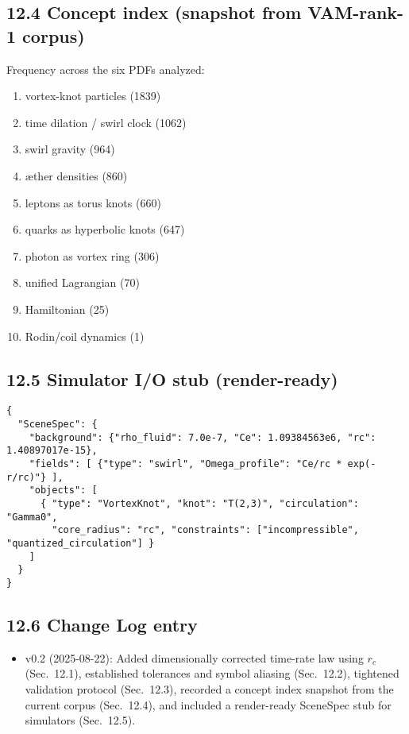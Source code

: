 \documentclass[11pt, a4paper]{article}
\begin{document}
\subsection*{12.4 Concept index (snapshot from VAM-rank-1 corpus)}

Frequency across the six PDFs analyzed:

\begin{enumerate}
    \item vortex-knot particles (1839)
    \item time dilation / swirl clock (1062)
    \item swirl gravity (964)
    \item æther densities (860)
    \item leptons as torus knots (660)
    \item quarks as hyperbolic knots (647)
    \item photon as vortex ring (306)
    \item unified Lagrangian (70)
    \item Hamiltonian (25)
    \item Rodin/coil dynamics (1)
\end{enumerate}

\subsection*{12.5 Simulator I/O stub (render-ready)}

\begin{verbatim}
{
  "SceneSpec": {
    "background": {"rho_fluid": 7.0e-7, "Ce": 1.09384563e6, "rc": 1.40897017e-15},
    "fields": [ {"type": "swirl", "Omega_profile": "Ce/rc * exp(-r/rc)"} ],
    "objects": [
      { "type": "VortexKnot", "knot": "T(2,3)", "circulation": "Gamma0",
        "core_radius": "rc", "constraints": ["incompressible", "quantized_circulation"] }
    ]
  }
}
\end{verbatim}

\subsection*{12.6 Change Log entry}

\begin{itemize}
    \item v0.2 (2025-08-22): Added dimensionally corrected time-rate law using $r_c$ (Sec.~12.1), established tolerances and symbol aliasing (Sec.~12.2), tightened validation protocol (Sec.~12.3), recorded a concept index snapshot from the current corpus (Sec.~12.4), and included a render-ready SceneSpec stub for simulators (Sec.~12.5).
\end{itemize}
\end{document}

